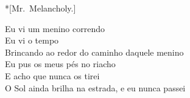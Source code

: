 \begin{dedication}*[Mr.\ Melancholy.]
\end{dedication}
\vfill

\begin{dedication}
  Eu vi um menino correndo\\
  Eu vi o tempo\\
  Brincando ao redor do caminho daquele menino\\
  Eu pus os meus pés no riacho\\
  E acho que nunca os tirei\\
  O Sol ainda brilha na estrada, e eu nunca passei
\end{dedication}
